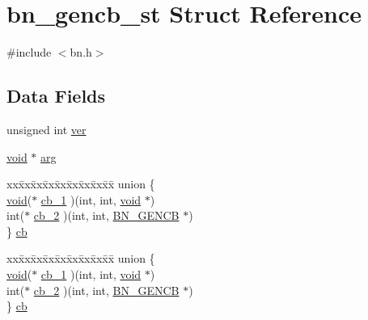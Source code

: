 \hypertarget{structbn__gencb__st}{}\section{bn\+\_\+gencb\+\_\+st Struct Reference}
\label{structbn__gencb__st}


{\ttfamily \#include $<$bn.\+h$>$}

\subsection*{Data Fields}
\begin{DoxyCompactItemize}
\item 
unsigned int \hyperlink{structbn__gencb__st_aee119b00fe81f0baf8518dae456c9dc9}{ver}
\item 
\hyperlink{hw__4758__cca_8h_afad4d591c7931ff6dc5bf69c76c96aa0}{void} $\ast$ \hyperlink{structbn__gencb__st_ae036856e415526e58e249638733f6752}{arg}
\item 
\begin{tabbing}
xx\=xx\=xx\=xx\=xx\=xx\=xx\=xx\=xx\=\kill
union \{\\
\>\hyperlink{hw__4758__cca_8h_afad4d591c7931ff6dc5bf69c76c96aa0}{void}($\ast$ \hyperlink{structbn__gencb__st_aa539df7ce1350e22f8e6d80851ee9880}{cb\_1} )(int, int, \hyperlink{hw__4758__cca_8h_afad4d591c7931ff6dc5bf69c76c96aa0}{void} $\ast$)\\
\>int($\ast$ \hyperlink{structbn__gencb__st_afa25214ca7d6721c7c6f449d564adf73}{cb\_2} )(int, int, \hyperlink{crypto_2ossl__typ_8h_ae122a8be18f4fe821e5389381ececa09}{BN\_GENCB} $\ast$)\\
\} \hyperlink{structbn__gencb__st_ae9defd028d3c66dbbe071526ab06937e}{cb}\\

\end{tabbing}\item 
\begin{tabbing}
xx\=xx\=xx\=xx\=xx\=xx\=xx\=xx\=xx\=\kill
union \{\\
\>\hyperlink{hw__4758__cca_8h_afad4d591c7931ff6dc5bf69c76c96aa0}{void}($\ast$ \hyperlink{structbn__gencb__st_aa539df7ce1350e22f8e6d80851ee9880}{cb\_1} )(int, int, \hyperlink{hw__4758__cca_8h_afad4d591c7931ff6dc5bf69c76c96aa0}{void} $\ast$)\\
\>int($\ast$ \hyperlink{structbn__gencb__st_afa25214ca7d6721c7c6f449d564adf73}{cb\_2} )(int, int, \hyperlink{crypto_2ossl__typ_8h_ae122a8be18f4fe821e5389381ececa09}{BN\_GENCB} $\ast$)\\
\} \hyperlink{structbn__gencb__st_afce0375516e5e19134a224446c751f15}{cb}\\

\end{tabbing}\end{DoxyCompactItemize}


